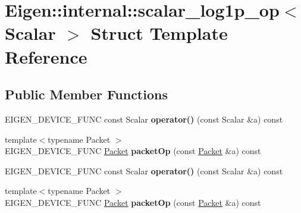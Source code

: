 \hypertarget{struct_eigen_1_1internal_1_1scalar__log1p__op}{}\section{Eigen\+:\+:internal\+:\+:scalar\+\_\+log1p\+\_\+op$<$ Scalar $>$ Struct Template Reference}
\label{struct_eigen_1_1internal_1_1scalar__log1p__op}
\subsection*{Public Member Functions}
\begin{DoxyCompactItemize}
\item 
\mbox{\label{struct_eigen_1_1internal_1_1scalar__log1p__op_a0ff14b196b88f85b2e5174940dcb3897}} 
E\+I\+G\+E\+N\+\_\+\+D\+E\+V\+I\+C\+E\+\_\+\+F\+U\+NC const Scalar {\bfseries operator()} (const Scalar \&a) const
\item 
\mbox{\label{struct_eigen_1_1internal_1_1scalar__log1p__op_a9802c0a7a3a1a5572c26ab99d0e35752}} 
{\footnotesize template$<$typename Packet $>$ }\\E\+I\+G\+E\+N\+\_\+\+D\+E\+V\+I\+C\+E\+\_\+\+F\+U\+NC \hyperlink{union_eigen_1_1internal_1_1_packet}{Packet} {\bfseries packet\+Op} (const \hyperlink{union_eigen_1_1internal_1_1_packet}{Packet} \&a) const
\item 
\mbox{\label{struct_eigen_1_1internal_1_1scalar__log1p__op_a0ff14b196b88f85b2e5174940dcb3897}} 
E\+I\+G\+E\+N\+\_\+\+D\+E\+V\+I\+C\+E\+\_\+\+F\+U\+NC const Scalar {\bfseries operator()} (const Scalar \&a) const
\item 
\mbox{\label{struct_eigen_1_1internal_1_1scalar__log1p__op_a9802c0a7a3a1a5572c26ab99d0e35752}} 
{\footnotesize template$<$typename Packet $>$ }\\E\+I\+G\+E\+N\+\_\+\+D\+E\+V\+I\+C\+E\+\_\+\+F\+U\+NC \hyperlink{union_eigen_1_1internal_1_1_packet}{Packet} {\bfseries packet\+Op} (const \hyperlink{union_eigen_1_1internal_1_1_packet}{Packet} \&a) const
\end{DoxyCompactItemize}


